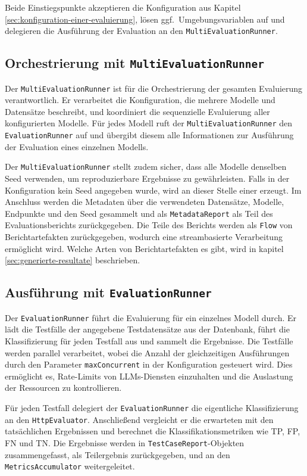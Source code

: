 Beide Einstiegspunkte akzeptieren die Konfiguration aus Kapitel \ref{sec:konfiguration-einer-evaluierung}, lösen ggf.\ Umgebungsvariablen auf und delegieren die Ausführung der Evaluation an den \texttt{MultiEvaluationRunner}.

\subsection*{Orchestrierung mit \texttt{MultiEvaluationRunner}}

Der \texttt{MultiEvaluationRunner} ist für die Orchestrierung der gesamten Evaluierung verantwortlich. Er verarbeitet die Konfiguration, die mehrere Modelle und Datensätze beschreibt, und koordiniert die sequenzielle Evaluierung aller konfigurierten Modelle. Für jedes Modell ruft der \texttt{MultiEvaluationRunner} den \texttt{EvaluationRunner} auf und übergibt diesem alle Informationen zur Ausführung der Evaluation eines einzelnen Modells.

Der \texttt{MultiEvaluationRunner} stellt zudem sicher, dass alle Modelle denselben Seed verwenden, um reproduzierbare Ergebnisse zu gewährleisten. Falls in der Konfiguration kein Seed angegeben wurde, wird an dieser Stelle einer erzeugt. Im Anschluss werden die Metadaten über die verwendeten Datensätze, Modelle, Endpunkte und den Seed gesammelt und als \texttt{MetadataReport} als Teil des Evaluationsberichts zurückgegeben. Die Teile des Berichts werden als \texttt{Flow} von Berichtartefakten zurückgegeben, wodurch eine streambasierte Verarbeitung ermöglicht wird. Welche Arten von Berichtartefakten es gibt, wird in kapitel \ref{sec:generierte-resultate} beschrieben.

\subsection*{Ausführung mit \texttt{EvaluationRunner}}

Der \texttt{EvaluationRunner} führt die Evaluierung für ein einzelnes Modell durch. Er lädt die Testfälle der angegebene Testdatensätze aus der Datenbank, führt die Klassifizierung für jeden Testfall aus und sammelt die Ergebnisse. Die Testfälle werden parallel verarbeitet, wobei die Anzahl der gleichzeitigen Ausführungen durch den Parameter \texttt{maxConcurrent} in der Konfiguration gesteuert wird. Dies ermöglicht es, Rate-Limits von \acp{LLM}-Diensten einzuhalten und die Auslastung der Ressourcen zu kontrollieren.

Für jeden Testfall delegiert der \texttt{EvaluationRunner} die eigentliche Klassifizierung an den \texttt{HttpEvaluator}. Anschließend vergleicht er die erwarteten mit den tatsächlichen Ergebnissen und berechnet die Klassifikationsmetriken wie \ac{TP}, \ac{FP}, \ac{FN} und \ac{TN}. Die Ergebnisse werden in \texttt{TestCaseReport}-Objekten zusammengefasst, als Teilergebnis zurückgegeben, und an den \texttt{MetricsAccumulator} weitergeleitet.

